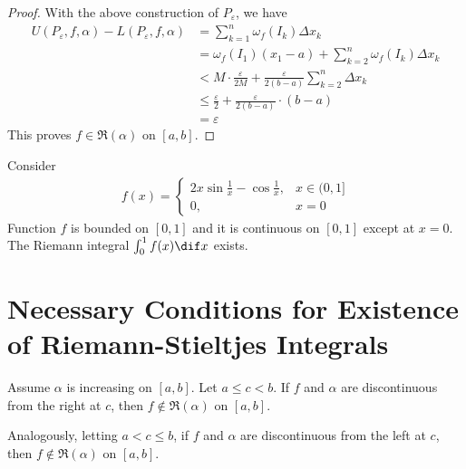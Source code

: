 \documentclass[thmcnt=section, color=blue, 12pt]{my-elegantbook}
\begin{document}
\begin{proof}
	With the above construction of $P_\varepsilon$, we have
	\begin{align*}
		U(P_\varepsilon, f, \alpha) - L(P_\varepsilon, f, \alpha)
		 & = \sum_{k=1}^n \omega_f(I_k) \Delta x_k                             \\
		 & = \omega_f (I_1) (x_1 - a) + \sum_{k=2}^n \omega_f(I_k) \Delta x_k  \\
		 & < M \cdot \frac{\varepsilon}{2 M}
		+ \frac{\varepsilon}{2(b-a)} \sum_{k=2}^n \Delta x_k                   \\
		 & \leq \frac{\varepsilon}{2} + \frac{\varepsilon}{2(b-a)} \cdot (b-a) \\
		 & = \varepsilon
	\end{align*}
	This proves $f \in \mathfrak{R}(\alpha)$ on $[a, b]$.
\end{proof}

\begin{example} \label{eg:3}
	Consider
	\begin{align*}
		f(x) = \begin{cases}
			       2x \sin \frac{1}{x} - \cos \frac{1}{x}, & x \in (0, 1] \\
			       0,                                      & x=0
		       \end{cases}
	\end{align*}
	Function $f$ is bounded on $[0, 1]$ and it is continuous on $[0, 1]$
	except at $x=0$.
	The Riemann integral $\int_0^1 f(x) \dif x$ exists.
\end{example}

\section{Necessary Conditions for Existence of Riemann-Stieltjes Integrals}

\begin{theorem}
	Assume $\alpha$ is increasing on $[a, b]$.
	Let $a \leq c < b$.
	If $f$ and $\alpha$ are discontinuous from the right at $c$,
	then $f \notin \mathfrak{R}(\alpha)$ on $[a, b]$.

	Analogously, letting $a < c \leq b$,
	if $f$ and $\alpha$ are discontinuous from the left at $c$,
	then $f \notin \mathfrak{R}(\alpha)$ on $[a, b]$.
\end{theorem}
\end{document}
